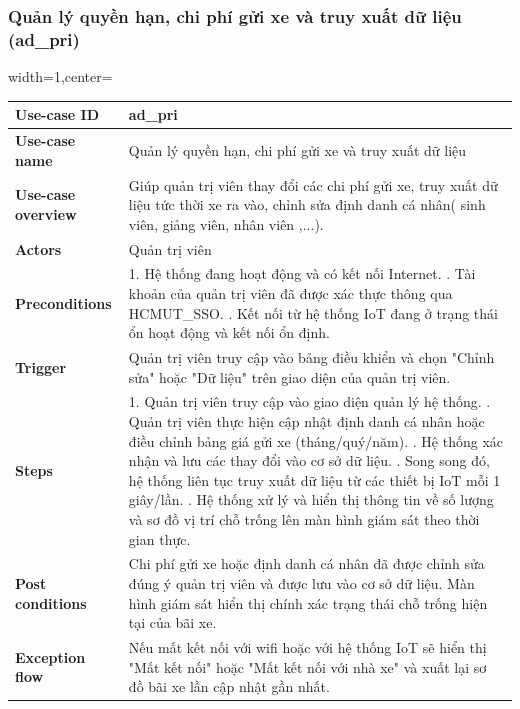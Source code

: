 \subsubsection{Quản lý quyền hạn, chi phí gửi xe và truy xuất dữ liệu (ad\_pri)}
\begin{adjustbox}{width=1\textwidth,center=\textwidth}
\small
\begin{tabular}{|>{\centering\arraybackslash}m{3.5cm}|m{13.2cm}|}
\hline
\textbf{Use-case ID} & ad\_pri \\ \hline
\textbf{Use-case name} & Quản lý quyền hạn, chi phí gửi xe và truy xuất dữ liệu \\ \hline
\textbf{Use-case overview} & Giúp quản trị viên thay đổi các chi phí gửi xe, truy xuất dữ liệu tức thời xe ra vào, chỉnh sửa định danh cá nhân( sinh viên, giảng viên, nhân viên ,...). \\ \hline
\textbf{Actors} & Quản trị viên \\ \hline
\textbf{Preconditions} & 
1. Hệ thống đang hoạt động và có kết nối Internet. \newline
2. Tài khoản của quản trị viên đã được xác thực thông qua HCMUT\_SSO. \newline
3. Kết nối từ hệ thống IoT đang ở trạng thái ổn hoạt động và kết nối ổn định. \\ \hline
\textbf{Trigger} & Quản trị viên truy cập vào bảng điều khiển và chọn "Chỉnh sửa" hoặc "Dữ liệu" trên giao diện của quản trị viên. \\ \hline
\textbf{Steps} & 
1. Quản trị viên truy cập vào giao diện quản lý hệ thống. \newline
2. Quản trị viên thực hiện cập nhật định danh cá nhân hoặc điều chỉnh bảng giá gửi xe (tháng/quý/năm). \newline
3. Hệ thống xác nhận và lưu các thay đổi vào cơ sở dữ liệu. \newline
4. Song song đó, hệ thống liên tục truy xuất dữ liệu từ các thiết bị IoT mỗi 1 giây/lần. \newline
5. Hệ thống xử lý và hiển thị thông tin về số lượng và sơ đồ vị trí chỗ trống lên màn hình giám sát theo thời gian thực.\\ \hline
\textbf{Post conditions} & Chi phí gửi xe hoặc định danh cá nhân đã được chỉnh sửa đúng ý quản trị viên và được lưu vào cơ sở dữ liệu. Màn hình giám sát hiển thị chính xác trạng thái chỗ trống hiện tại của bãi xe.\\ \hline
\textbf{Exception flow} & Nếu mất kết nối với wifi hoặc với hệ thống IoT sẽ hiển thị "Mất kết nối" hoặc "Mất kết nối với nhà xe" và xuất lại sơ đồ bãi xe lần cập nhật gần nhất. \\ \hline
\end{tabular}
\end{adjustbox}

